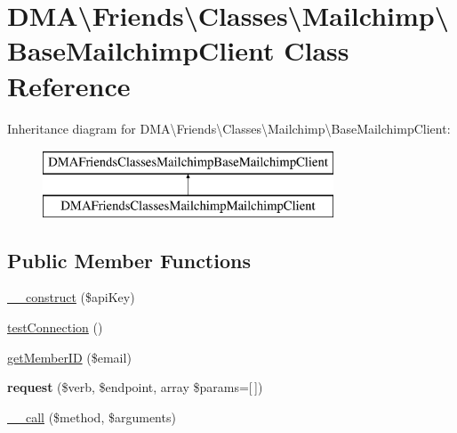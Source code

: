 \hypertarget{classDMA_1_1Friends_1_1Classes_1_1Mailchimp_1_1BaseMailchimpClient}{}\section{D\+M\+A\textbackslash{}Friends\textbackslash{}Classes\textbackslash{}Mailchimp\textbackslash{}Base\+Mailchimp\+Client Class Reference}
\label{classDMA_1_1Friends_1_1Classes_1_1Mailchimp_1_1BaseMailchimpClient}
Inheritance diagram for D\+M\+A\textbackslash{}Friends\textbackslash{}Classes\textbackslash{}Mailchimp\textbackslash{}Base\+Mailchimp\+Client\+:\begin{figure}[H]
\begin{center}
\leavevmode
\includegraphics[height=2.000000cm]{d1/dd6/classDMA_1_1Friends_1_1Classes_1_1Mailchimp_1_1BaseMailchimpClient}
\end{center}
\end{figure}
\subsection*{Public Member Functions}
\begin{DoxyCompactItemize}
\item 
\hyperlink{classDMA_1_1Friends_1_1Classes_1_1Mailchimp_1_1BaseMailchimpClient_a4377953c998ef52d14b2f57a1dff6973}{\+\_\+\+\_\+construct} (\$api\+Key)
\item 
\hyperlink{classDMA_1_1Friends_1_1Classes_1_1Mailchimp_1_1BaseMailchimpClient_a95092360349c0ba1ecb1cfe15be3b76a}{test\+Connection} ()
\item 
\hyperlink{classDMA_1_1Friends_1_1Classes_1_1Mailchimp_1_1BaseMailchimpClient_a66c564aa4d03977776de6a16ea2c4a8b}{get\+Member\+I\+D} (\$email)
\item 
\hypertarget{classDMA_1_1Friends_1_1Classes_1_1Mailchimp_1_1BaseMailchimpClient_ab585a80646f3345251c3ac8d1d2593e8}{}{\bfseries request} (\$verb, \$endpoint, array \$params=\mbox{[}$\,$\mbox{]})\label{classDMA_1_1Friends_1_1Classes_1_1Mailchimp_1_1BaseMailchimpClient_ab585a80646f3345251c3ac8d1d2593e8}

\item 
\hyperlink{classDMA_1_1Friends_1_1Classes_1_1Mailchimp_1_1BaseMailchimpClient_a0597a22d52cba2eb3ef7f870fb90c574}{\+\_\+\+\_\+call} (\$method, \$arguments)
\end{DoxyCompactItemize}
